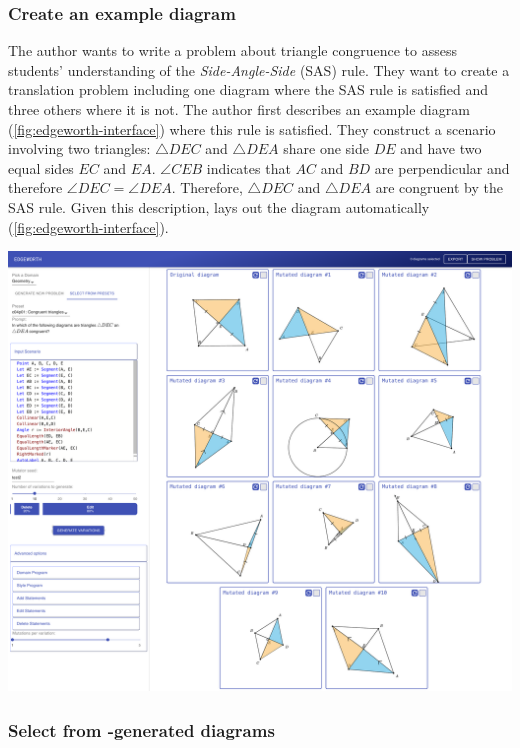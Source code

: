 \subsubsection{Create an example diagram} 
\label{sec:create-scenario}

The author wants to write a problem about triangle congruence to assess students' understanding of the \textit{Side-Angle-Side} (SAS) rule. They want to create a translation problem including one diagram where the SAS rule is satisfied and three others where it is not. The author first describes an example diagram (\cref{fig:edgeworth-interface}) where this rule is satisfied. They construct a scenario involving two triangles: $\triangle DEC$ and $\triangle DEA$ share one side $DE$ and have two equal sides $EC$ and $EA$. $\angle CEB$ indicates that $AC$ and $BD$ are perpendicular and therefore $\angle DEC = \angle DEA$. Therefore, $\triangle DEC$ and $\triangle DEA$ are congruent by the SAS rule. Given this description, \Edgeworth lays out the diagram automatically (\cref{fig:edgeworth-interface}). 

\begin{center}
\includegraphics[width=0.3\linewidth]{assets/edgeworth/edgeworth-ui-correct.pdf}
\end{center}



\subsubsection{Select from \Edgeworth-generated diagrams}
\label{sec:select-diagrams}

